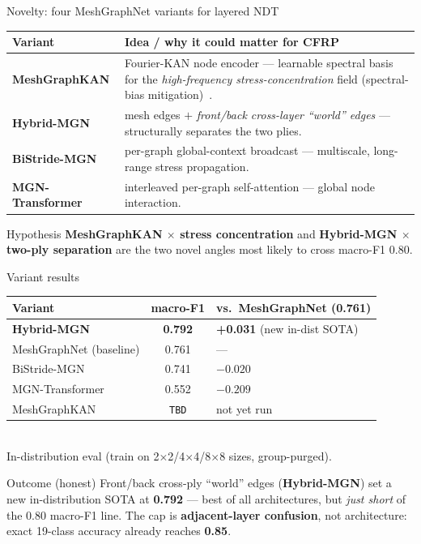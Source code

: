 \documentclass[aspectratio=169,10pt]{beamer}
\newcommand{\best}[1]{{\color{okgreen}\textbf{#1}}}
\begin{document}
\begin{frame}{Novelty: four MeshGraphNet variants for layered NDT}
\begin{tabular}{p{2.7cm} p{7.5cm}}
\toprule
Variant & Idea / why it could matter for CFRP \\
\midrule
\textbf{MeshGraphKAN} & Fourier-KAN node encoder — learnable spectral basis for the
  \emph{high-frequency stress-concentration} field (spectral-bias mitigation)~\cite{tancik2020fourier}. \\[2pt]
\textbf{Hybrid-MGN} & mesh edges $+$ \emph{front/back cross-layer ``world'' edges} —
  structurally separates the two plies. \\[2pt]
\textbf{BiStride-MGN} & per-graph global-context broadcast — multiscale, long-range
  stress propagation. \\[2pt]
\textbf{MGN-Transformer} & interleaved per-graph self-attention — global node interaction. \\
\bottomrule
\end{tabular}
\vspace{0.5em}
\begin{alertblock}{Hypothesis}
\textbf{MeshGraphKAN $\times$ stress concentration} and
\textbf{Hybrid-MGN $\times$ two-ply separation} are the two novel angles most
likely to cross macro-F1 $0.80$.
\end{alertblock}
\end{frame}

\begin{frame}{Variant results}
\centering
\begin{tabular}{lcl}
\toprule
Variant & macro-F1 & vs.\ MeshGraphNet (0.761) \\
\midrule
\best{Hybrid-MGN}       & \best{0.792} & \textbf{+0.031} (new in-dist SOTA) \\
MeshGraphNet (baseline) & 0.761 & --- \\
BiStride-MGN     & 0.741 & $-0.020$ \\
MGN-Transformer  & 0.552 & $-0.209$ \\
MeshGraphKAN     & \texttt{TBD} & not yet run \\
\bottomrule
\end{tabular}
\vspace{0.4em}\\
{\scriptsize In-distribution eval (train on 2$\times$2/4$\times$4/8$\times$8 sizes, group-purged).}
\vspace{0.6em}

\begin{block}{Outcome (honest)}
Front/back cross-ply ``world'' edges (\textbf{Hybrid-MGN}) set a new
in-distribution SOTA at \textbf{0.792} --- best of all architectures, but
\emph{just short} of the 0.80 macro-F1 line. The cap is \textbf{adjacent-layer
confusion}, not architecture: exact 19-class accuracy already reaches
\textbf{0.85}.
\end{block}
\end{frame}
\end{document}
